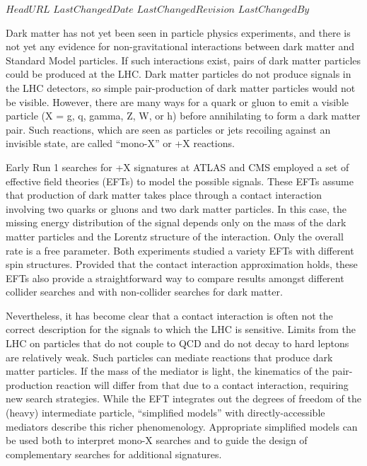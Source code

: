 \svnidlong
{$HeadURL$}
{$LastChangedDate$}
{$LastChangedRevision$}
{$LastChangedBy$}
\pagestyle{fancy}
\fancyhead{}
\fancyhead[ol]{\svnrev;\svndate;\svnauthor}

Dark matter has not yet been seen in particle physics experiments, and
there is not yet any evidence for non-gravitational interactions
between dark matter and Standard Model particles.  If such
interactions exist, pairs of dark matter particles could be produced
at the LHC. Dark matter particles do not produce signals in the LHC
detectors, so simple pair-production of dark matter particles would
not be visible. However, there are many ways for a quark or gluon to
emit a visible particle (X = g, q, gamma, Z, W, or h) before
annihilating to form a dark matter pair. Such reactions, which are
seen as particles or jets recoiling against an invisible state, are
called ``mono-X'' or \MET{}+X reactions.

Early Run 1 searches for \MET{}+X signatures at ATLAS and CMS employed
a set of effective field theories (EFTs) \cite{Goodman:2010ku} to
model the possible signals. These EFTs assume that production of dark
matter takes place through a contact interaction involving two quarks
or gluons and two dark matter particles. In this case, the missing
energy distribution of the signal depends only on the mass of the dark
matter particles and the Lorentz structure of the interaction. Only the
overall rate is a free parameter. Both experiments studied a variety
EFTs with different spin structures. Provided that the contact
interaction approximation holds, these EFTs also provide a
straightforward way to compare results amongst different collider
searches and with non-collider searches for dark matter.

Nevertheless, it has become clear \cite{Bai:2010hh,Kopp:2011eu,Fox:2011fx,Fox:2011pm,Busoni:2013lha} that a contact
interaction is often not the correct description for the signals to
which the LHC is sensitive. Limits from the LHC on particles that do
not couple to QCD and do not decay to hard leptons are relatively
weak. Such particles can mediate reactions that produce dark matter
particles. If the mass of the mediator is light, the kinematics of the
pair-production reaction will differ from that due to a contact
interaction, requiring new search strategies. While the EFT integrates
out the degrees of freedom of the (heavy) intermediate particle,
``simplified models'' \cite{Alwall:2008ag,Alves:2011wf} with
directly-accessible mediators describe this richer
phenomenology. Appropriate simplified models can be used both to
interpret mono-X searches and to guide the design of complementary
searches for additional signatures.

